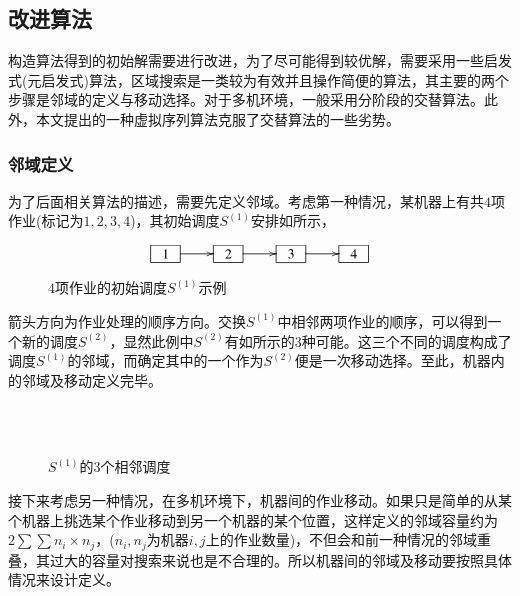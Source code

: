 \subsection{改进算法}
构造算法得到的初始解需要进行改进，为了尽可能得到较优解，需要采用一些启发式(元启发式)算法，区域搜索是一类较为有效并且操作简便的算法，其主要的两个步骤是邻域的定义与移动选择。对于多机环境，一般采用分阶段的交替算法。此外，本文提出的一种虚拟序列算法克服了交替算法的一些劣势。

\subsubsection{邻域定义}
为了后面相关算法的描述，需要先定义邻域。考虑第一种情况，某机器上有共$4$项作业(标记为$1,2,3,4$)，其初始调度$S^{(1)}$安排如所示，
\begin{figure}[h]
\begin{equation*}
\xymatrix{
\jobunit{1} \ar[r] & \jobunit{2} \ar[r] &\jobunit{3} \ar[r] &\jobunit{4}
}
\end{equation*}
\caption{$4$项作业的初始调度$S^{(1)}$示例\label{fig:4example}}
\end{figure}
箭头方向为作业处理的顺序方向。交换$S^{(1)}$中相邻两项作业的顺序，可以得到一个新的调度$S^{(2)}$，显然此例中$S^{(2)}$有如所示的$3$种可能。这三个不同的调度构成了调度$S^{(1)}$的邻域，而确定其中的一个作为$S^{(2)}$便是一次移动选择。至此，机器内的邻域及移动定义完毕。

\begin{figure}[h]
\centering
\vspace{1.5em}
\\
\\
\caption{$S^{(1)}$的$3$个相邻调度\label{fig:3neighbors}}
\end{figure}

接下来考虑另一种情况，在多机环境下，机器间的作业移动。如果只是简单的从某个机器上挑选某个作业移动到另一个机器的某个位置，这样定义的邻域容量约为$2\sum\sum n_i\times n_j$，($n_i,n_j$为机器$i,j$上的作业数量)，不但会和前一种情况的邻域重叠，其过大的容量对搜索来说也是不合理的。所以机器间的邻域及移动要按照具体情况来设计定义。

